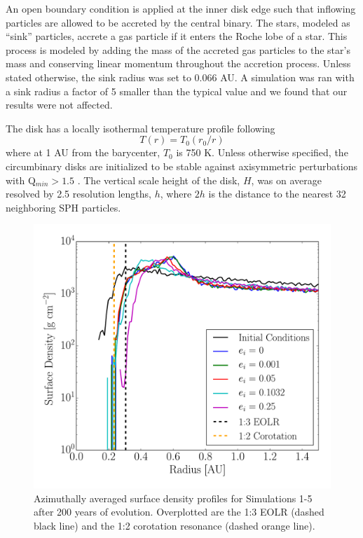 An open boundary condition is applied at the inner disk edge such that inflowing particles are allowed to be accreted
by the central binary.  The stars, modeled as ``sink'' particles, accrete a gas particle if it enters the Roche lobe of a star.  This process is modeled by adding the mass of the accreted gas particles to the star's mass and conserving linear momentum throughout the accretion process.  Unless stated otherwise, the 
sink radius was set to 0.066 AU.  A simulation was ran with a sink radius a factor of 5 smaller than the typical value and we found that our results were not 
affected.
 
The disk has a locally isothermal temperature profile following 
\begin{equation}
\label{CBDisk:eqn:disc_temp_profile}
T(r) = T_0(r_0/r)
\end{equation}
where at 1 AU from the barycenter, $T_0$ is
750 K.  Unless otherwise specified, the circumbinary disks are initialized to be stable against axisymmetric perturbations with Q$_{min} > 1.5$ \citep{Toomre1964}.
The vertical scale height of the disk, $H$, was on average resolved by
  2.5 resolution lengths, $h$, where $2 h$ is the distance
to the nearest 32 neighboring SPH particles.

\begin{figure}
	\includegraphics[width=\columnwidth]{f1}
    \caption{Azimuthally averaged surface density profiles for Simulations 1-5 after 200 years of evolution.  Overplotted are the 1:3 EOLR (dashed black line) and the 1:2 corotation resonance (dashed orange line).}
    \label{fig:CBDiskSurfaceDensity}
\end{figure}

